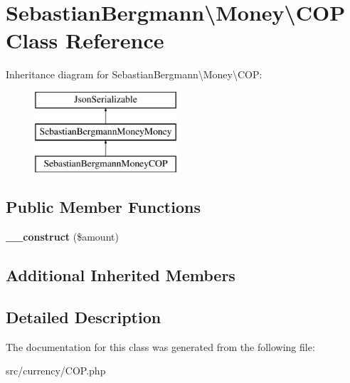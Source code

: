\hypertarget{classSebastianBergmann_1_1Money_1_1COP}{}\section{Sebastian\+Bergmann\textbackslash{}Money\textbackslash{}C\+O\+P Class Reference}
\label{classSebastianBergmann_1_1Money_1_1COP}
Inheritance diagram for Sebastian\+Bergmann\textbackslash{}Money\textbackslash{}C\+O\+P\+:\begin{figure}[H]
\begin{center}
\leavevmode
\includegraphics[height=3.000000cm]{classSebastianBergmann_1_1Money_1_1COP}
\end{center}
\end{figure}
\subsection*{Public Member Functions}
\begin{DoxyCompactItemize}
\item 
\hypertarget{classSebastianBergmann_1_1Money_1_1COP_a24472d76486c162a2b960901cccb4e75}{}{\bfseries \+\_\+\+\_\+construct} (\$amount)\label{classSebastianBergmann_1_1Money_1_1COP_a24472d76486c162a2b960901cccb4e75}

\end{DoxyCompactItemize}
\subsection*{Additional Inherited Members}


\subsection{Detailed Description}


The documentation for this class was generated from the following file\+:\begin{DoxyCompactItemize}
\item 
src/currency/C\+O\+P.\+php\end{DoxyCompactItemize}

